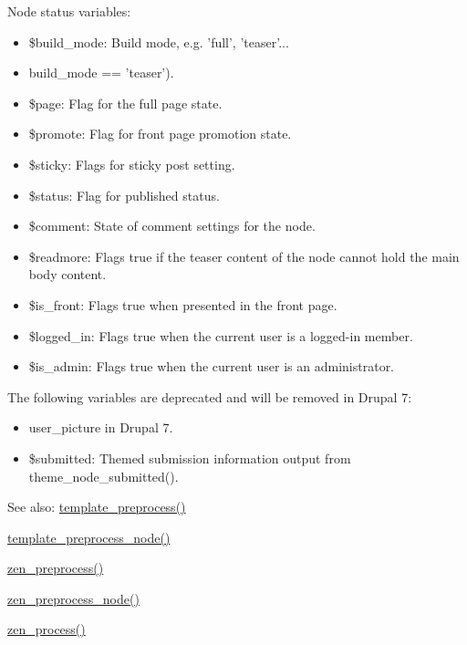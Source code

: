 Node status variables:\begin{itemize}
\item \$build\_\-mode: Build mode, e.g. 'full', 'teaser'...\item {}
build\_\-mode == 'teaser').\item \$page: Flag for the full page state.\item \$promote: Flag for front page promotion state.\item \$sticky: Flags for sticky post setting.\item \$status: Flag for published status.\item \$comment: State of comment settings for the node.\item \$readmore: Flags true if the teaser content of the node cannot hold the main body content.\item \$is\_\-front: Flags true when presented in the front page.\item \$logged\_\-in: Flags true when the current user is a logged-in member.\item \$is\_\-admin: Flags true when the current user is an administrator.\end{itemize}


The following variables are deprecated and will be removed in Drupal 7:\begin{itemize}
\item {}
user\_\-picture in Drupal 7.\item \$submitted: Themed submission information output from theme\_\-node\_\-submitted().\end{itemize}


\begin{Desc}
\item[See also:]\hyperlink{includes_2theme_8inc_3eeb7bcdba7ef4859f99586da264d347}{template\_\-preprocess()} 

\hyperlink{includes_2theme_8inc_bba818ede4c18fb7d92f0a5d5f1aa771}{template\_\-preprocess\_\-node()} 

\hyperlink{sites_2all_2themes_2zen_2template_8php_34cb06c8098f8e1c710c501bb9a64d8b}{zen\_\-preprocess()} 

\hyperlink{sites_2all_2themes_2zen_2template_8php_e04e9c17a2287b871b2d29ec76cd4214}{zen\_\-preprocess\_\-node()} 

\hyperlink{sites_2all_2themes_2zen_2template_8php_3790b825810aa4bfd00c27c37817a7d8}{zen\_\-process()} \end{Desc}
